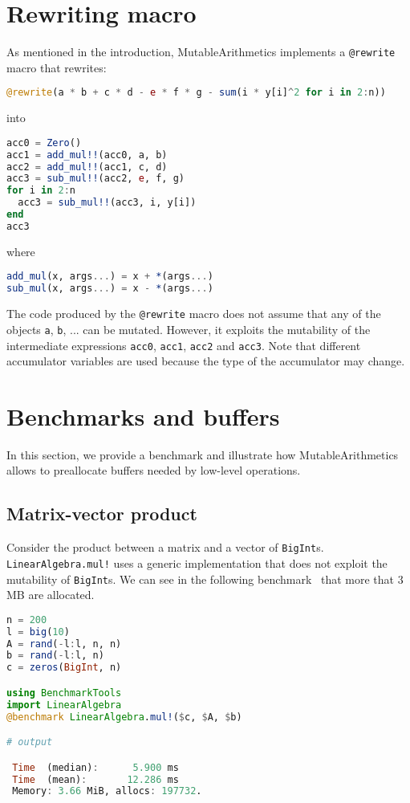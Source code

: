 \documentclass{juliacon}
\newcommand{\ma}{MutableArithmetics}
\begin{document}
\section{Rewriting macro}

As mentioned in the introduction, \ma{} implements a \lstinline|@rewrite| macro that rewrites:
\begin{lstlisting}[language = Julia]
@rewrite(a * b + c * d - e * f * g - sum(i * y[i]^2 for i in 2:n))
\end{lstlisting}
into
\begin{lstlisting}[language = Julia]
acc0 = Zero()
acc1 = add_mul!!(acc0, a, b)
acc2 = add_mul!!(acc1, c, d)
acc3 = sub_mul!!(acc2, e, f, g)
for i in 2:n
  acc3 = sub_mul!!(acc3, i, y[i])
end
acc3
\end{lstlisting}
where
\begin{lstlisting}[language = Julia]
add_mul(x, args...) = x + *(args...)
sub_mul(x, args...) = x - *(args...)
\end{lstlisting}

The code produced by the \lstinline|@rewrite| macro does not assume
that any of the objects \lstinline|a|, \lstinline|b|, ... can be mutated.
However, it exploits the mutability of the intermediate expressions
\lstinline|acc0|, \lstinline|acc1|, \lstinline|acc2| and \lstinline|acc3|.
Note that different accumulator variables are used because the type of the accumulator may change.

\section{Benchmarks and buffers}
In this section, we provide a benchmark and illustrate
how \ma{} allows to preallocate buffers needed by low-level operations.

\subsection{Matrix-vector product}
Consider the product between a matrix and a vector of \lstinline|BigInt|s.
\lstinline|LinearAlgebra.mul!| uses a generic implementation that does not exploit the mutability of \lstinline|BigInt|s.
We can see in the following benchmark~\cite{BenchmarkTools.jl-2016} that more that 3 MB are allocated.
\begin{lstlisting}[language = Julia]
n = 200
l = big(10)
A = rand(-l:l, n, n)
b = rand(-l:l, n)
c = zeros(BigInt, n)

using BenchmarkTools
import LinearAlgebra
@benchmark LinearAlgebra.mul!($c, $A, $b)

# output

 Time  (median):      5.900 ms
 Time  (mean):       12.286 ms
 Memory: 3.66 MiB, allocs: 197732.
\end{lstlisting}
\end{document}
